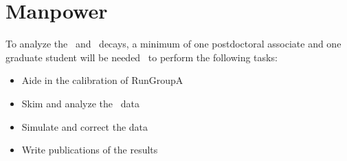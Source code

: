 \section{Manpower}\label{sec:manpower}
To analyze the \etaPDal \ and \phiDal \ decays, a minimum of one postdoctoral associate and one graduate student will be needed~ to perform the following tasks:
\begin{itemize}
	\item Aide in the calibration of RunGroupA
	\item Skim and analyze the \epemT \ data
	\item Simulate and correct the data
	\item Write publications of the results
\end{itemize}
